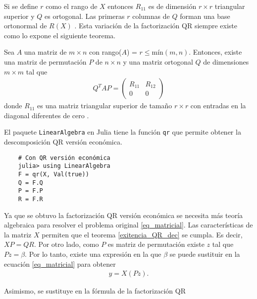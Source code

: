 Si se define $r$ como el rango de $X$ entonces $R_{11}$ es de dimensión $r \times r$ triangular superior y $Q$ es ortogonal. Las primeras $r$ columnas de $Q$ forman una base ortonormal de $R(X)$ \citep{numerical_linear_algebra}. Esta variación de la factorización QR siempre existe como lo expone el siguiente teorema.

\begin{theorem} \label{exitencia_QR_dec}
Sea $A$ una matriz de $m \times n$ con rango($A$) = $r \leq \text{mín} (m, n)$. Entonces, existe una matriz de permutación $P$ de $n \times n$ y una matriz ortogonal $Q$ de dimensiones $m \times m$ tal que 
\begin{equation*}
\begin{aligned}
Q^{T}AP = 
\begin{pmatrix}
R_{11} & R_{12} \\
   0      & 0
\end{pmatrix}
\end{aligned}
\end{equation*}
donde $R_{11}$ es una matriz triangular superior de tamaño $r \times r$ con entradas en la diagonal diferentes de cero \cite[p.~532]{numerical_linear_algebra}.
\end{theorem}

El paquete \texttt{LinearAlgebra} en \textsf{Julia} tiene la función \texttt{qr} que permite obtener la descomposición QR versión económica.  

\begin{verbatim}
    # Con QR versión económica
    julia> using LinearAlgebra
    F = qr(X, Val(true))
    Q = F.Q
    P = F.P
    R = F.R
\end{verbatim}

Ya que se obtuvo la factorización QR versión económica se necesita más teoría algebraica para resolver el problema original \ref{eq_matricial}. Las características de la matriz $X$ permiten que el teorema \ref{exitencia_QR_dec} se cumpla. Es decir, $XP = QR$. Por otro lado, como $P$ es matriz de permutación existe $z$ tal que $Pz = \beta$. Por lo tanto, existe una expresión en la que $\beta$ se puede sustituir en la ecuación \ref{eq_matricial} para obtener 
\begin{equation*}
    \begin{aligned}
    y = X (Pz) . 
    \end{aligned}
\end{equation*}

\noindent Asimismo, se sustituye en la fórmula de la factorización QR

